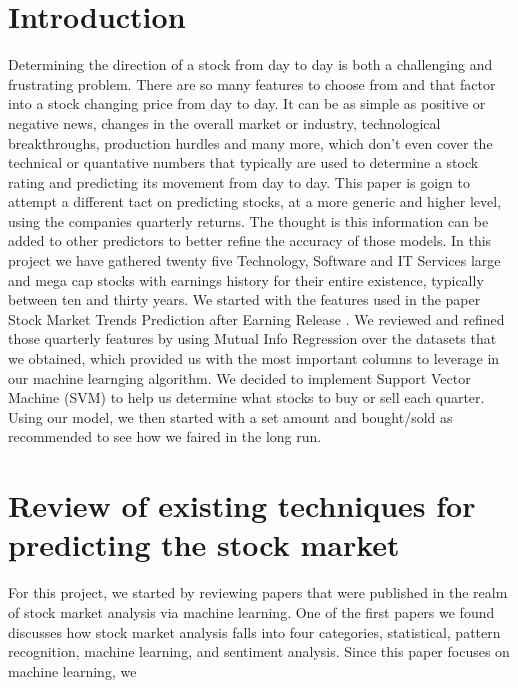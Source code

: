 \documentclass[conference]{IEEEtran}
\begin{document}

\section{Introduction}
Determining the direction of a stock from day to day is both a challenging and frustrating problem.  There are so many features to choose from and that factor into a stock changing price from day to day. It can be as simple as positive or negative news, changes in the overall market or industry, technological breakthroughs, production hurdles and many more, which don't even cover the technical or quantative numbers that typically are used to determine a stock rating and predicting its movement from day to day.  This paper is goign to attempt a different tact on predicting stocks, at a more generic and higher level, using the companies quarterly returns.  The thought is this information can be added to other predictors to better refine the accuracy of those models.  In this project we have gathered twenty five Technology, Software and IT Services large and mega cap stocks with earnings history for their entire existence, typically between ten and thirty years.  We started with the features used in the paper Stock Market Trends Prediction after Earning Release  \cite{QuarterlyPrediction}.  We reviewed and refined those quarterly features by using Mutual Info Regression over the datasets that we obtained, which provided us with the most important columns to leverage in our machine learnging algorithm.  We decided to implement Support Vector Machine (SVM) to help us determine what stocks to buy or sell each quarter.  Using our model, we then started with a set amount and bought/sold as recommended to see how we faired in the long run.


\section{Review of existing techniques for predicting the stock market}
For this project, we started by reviewing papers that were published in the realm of stock market analysis via machine learning.  One of the first papers we found \cite{TaxonomyofPrediction} discusses how stock market analysis falls into four categories, statistical, pattern recognition, machine learning, and sentiment analysis.  Since this paper focuses on machine learning, we
\end{document}

